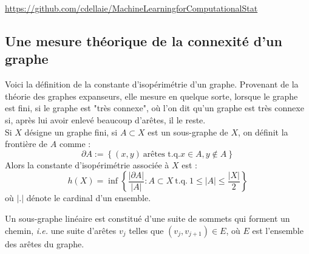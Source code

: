 \documentclass{article}
\begin{document}
\url{https://github.com/cdellaie/MachineLearningforComputationalStat}

\subsection{Une mesure théorique de la connexité d'un graphe}

Voici la définition de la constante d'isopérimétrie d'un graphe. Provenant de la théorie des graphes expanseurs, elle mesure en quelque sorte, lorsque le graphe est fini, si le graphe est "très connexe", où l'on dit qu'un graphe est très connexe si, après lui avoir enlevé beaucoup d'arêtes, il le reste.\\

Si $X$ désigne un graphe fini, si $A\subset X$ est un sous-graphe de $X$, on définit la frontière de $A$ comme :
\[\partial A := \left\{(x,y)\ \text{arêtes t.q.} x\in A,y \notin A\right\}\]
Alors la constante d'isopérimétrie associée à $X$ est :
\[h(X)=\inf\left\{ \frac{|\partial A|}{|A|} : A \subset X \ \text{t.q.}\ 1\leq |A|\leq \frac{|X|}{2}\right\}\]
où $|.|$ dénote le cardinal d'un ensemble.

Un sous-graphe linéaire est constitué d'une suite de sommets qui forment un chemin, \textit{i.e.} une suite d'arêtes $v_j$ telles que $(v_j,v_{j+1})\in E$, où $E$ est l'ensemble des arêtes du graphe. 



 
\end{document}
